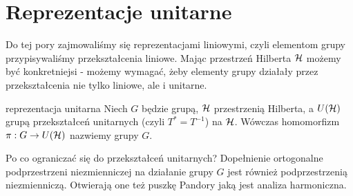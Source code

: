 \chapter{Reprezentacje unitarne}
\label{chapter:reprezentacje unitarne}

Do tej pory zajmowaliśmy się reprezentacjami liniowymi, czyli elementom grupy przypisywaliśmy przekształcenia liniowe. Mając przestrzeń Hilberta $\operatorname{\mathcal{H}}$ możemy być konkretniejsi - możemy wymagać, żeby elementy grupy działały przez przekształcenia nie tylko liniowe, ale i unitarne.

\begin{definition}{reprezentacja unitarna}{}
  Niech $G$ będzie grupą, $\operatorname{\mathcal{H}}$ przestrzenią Hilberta, a $U(\operatorname{\mathcal{H}})$ grupą przekształceń unitarnych (czyli $T^*=T^{-1}$) na $\operatorname{\mathcal{H}}$. Wówczas homomorfizm $\pi:G\to U(\operatorname{\mathcal{H}})$ nazwiemy  grupy $G$. 
\end{definition}

Po co ograniczać się do przekształceń unitarnych? Dopełnienie ortogonalne podprzestrzeni niezmienniczej na działanie grupy $G$ jest również podprzestrzenią niezmienniczą. Otwierają one też puszkę Pandory jaką jest analiza harmoniczna.









